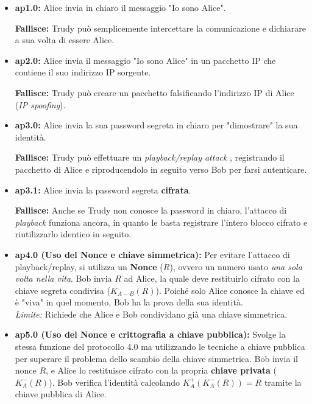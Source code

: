 \documentclass[a4paper,12pt]{report}
\begin{document}
\begin{itemize}
    \item \textbf{ap1.0:} Alice invia in chiaro il messaggio "Io sono Alice". 
    
    \textbf{Fallisce:} Trudy può semplicemente intercettare la comunicazione e dichiarare a sua volta di essere Alice.
    
    \item \textbf{ap2.0:} Alice invia il messaggio "Io sono Alice" in un pacchetto IP che contiene il suo indirizzo IP sorgente. 
    
    \textbf{Fallisce:} Trudy può creare un pacchetto falsificando l'indirizzo IP di Alice (\textit{IP spoofing}).
    
    \item \textbf{ap3.0:} Alice invia la sua password segreta in chiaro per "dimostrare" la sua identità. 
    
    \textbf{Fallisce:} Trudy può effettuare un \textit{playback/replay attack} , registrando il pacchetto di Alice e riproducendolo in seguito verso Bob per farsi autenticare.
    
    \item \textbf{ap3.1:} Alice invia la password segreta \textbf{cifrata}. 
    
    \textbf{Fallisce:} Anche se Trudy non conosce la password in chiaro, l'attacco di \textit{playback} funziona ancora, in quanto le basta registrare l'intero blocco cifrato e riutilizzarlo identico in seguito.
    
    \item \textbf{ap4.0 (Uso del Nonce e chiave simmetrica):} Per evitare l'attacco di playback/replay, si utilizza un \textbf{Nonce} ($R$), ovvero un numero usato \textit{una sola volta nella vita}. Bob invia $R$ ad Alice, la quale deve restituirlo cifrato con la chiave segreta condivisa ($K_{A-B}(R)$). Poiché solo Alice conosce la chiave ed è "viva" in quel momento, Bob ha la prova della sua identità. \\
    \textit{Limite:} Richiede che Alice e Bob condividano già una chiave simmetrica.
    
    \item \textbf{ap5.0 (Uso del Nonce e crittografia a chiave pubblica):} Svolge la stessa funzione del protocollo 4.0 ma utilizzando le tecniche a chiave pubblica per superare il problema dello scambio della chiave simmetrica. Bob invia il nonce $R$, e Alice lo restituisce cifrato con la propria \textbf{chiave privata} ($K_A^-(R)$). Bob verifica l'identità calcolando $K_A^+(K_A^-(R)) = R$ tramite la chiave pubblica di Alice.
\end{itemize}
\end{document}
